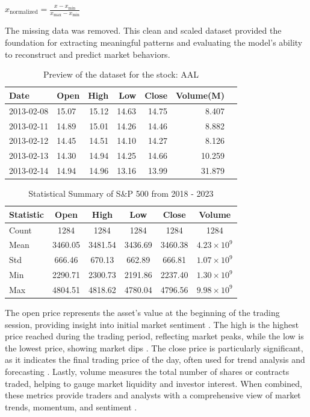 \documentclass[conference]{IEEEtran}
\begin{document}
\begin{center}
    $x_{\text{normalized}} = \frac{x - x_{\text{min}}}{x_{\text{max}} - x_{\text{min}}}$
\end{center}

The missing data was removed. This clean and scaled dataset provided the foundation for extracting meaningful patterns and evaluating the model's ability to reconstruct and predict market behaviors.

\begin{table}[h!]
\centering
\caption{Preview of the dataset for the stock: AAL}
\begin{tabular}{llrrrrr}
\textbf{Date} & \textbf{Open} & \textbf{High} & \textbf{Low} & \textbf{Close} & \textbf{Volume(M)}\\
\midrule
2013-02-08 & 15.07 & 15.12 & 14.63 & 14.75 & 8.407 \\
2013-02-11 & 14.89 & 15.01 & 14.26 & 14.46 & 8.882 \\
2013-02-12 & 14.45 & 14.51 & 14.10 & 14.27 & 8.126 \\
2013-02-13 & 14.30 & 14.94 & 14.25 & 14.66 & 10.259 \\
2013-02-14 & 14.94 & 14.96 & 13.16 & 13.99 & 31.879 \\
\bottomrule
\end{tabular}
\end{table}

\begin{table}[h!]
\centering
\caption{Statistical Summary of S\&P 500 from 2018 - 2023}
\begin{tabular}{lccccc}

\textbf{Statistic} & \textbf{Open}   & \textbf{High}   & \textbf{Low}    & \textbf{Close}  & \textbf{Volume}           \\
\midrule
Count     & 1284    & 1284    & 1284    & 1284    & 1284  \\ 
Mean      & 3460.05 & 3481.54 & 3436.69 & 3460.38 & $4.23 \times 10^9$ \\ 
Std       & 666.46  & 670.13  & 662.89  & 666.81  & $1.07 \times 10^9$ \\ 
Min       & 2290.71 & 2300.73 & 2191.86 & 2237.40 & $1.30 \times 10^9$ \\ 
Max       & 4804.51 & 4818.62 & 4780.04 & 4796.56 & $9.98 \times 10^9$ \\ \hline
\end{tabular}
\end{table}
The open price represents the asset's value at the beginning of the trading session, providing insight into initial market sentiment \cite{b11}. The high is the highest price reached during the trading period, reflecting market peaks, while the low is the lowest price, showing market dips \cite{b12}. The close price is particularly significant, as it indicates the final trading price of the day, often used for trend analysis and forecasting \cite{b13}. Lastly, volume measures the total number of shares or contracts traded, helping to gauge market liquidity and investor interest. When combined, these metrics provide traders and analysts with a comprehensive view of market trends, momentum, and sentiment \cite{b14}.
\end{document}
